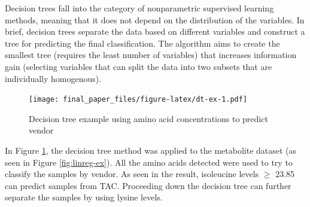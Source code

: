 \documentclass[12pt,openany]{book}
\newenvironment{Shaded}{\begin{snugshade}}{\end{snugshade}}
\newcommand{\KeywordTok}[1]{\textcolor[rgb]{0.13,0.29,0.53}{\textbf{#1}}}
\newcommand{\DataTypeTok}[1]{\textcolor[rgb]{0.13,0.29,0.53}{#1}}
\newcommand{\DecValTok}[1]{\textcolor[rgb]{0.00,0.00,0.81}{#1}}
\newcommand{\StringTok}[1]{\textcolor[rgb]{0.31,0.60,0.02}{#1}}
\newcommand{\OperatorTok}[1]{\textcolor[rgb]{0.81,0.36,0.00}{\textbf{#1}}}
\newcommand{\NormalTok}[1]{#1}
\begin{document}
Decision trees fall into the category of nonparametric supervised
learning methods, meaning that it does not depend on the distribution of
the variables. In brief, decision trees separate the data based on
different variables and construct a tree for predicting the final
classification. The algorithm aims to create the smallest tree (requires
the least number of variables) that increases information gain
(selecting variables that can split the data into two subsets that are
individually homogenous).

\begin{Shaded}
\end{Shaded}

\begin{figure}
\centering
\texttt{[image: final\_paper\_files/figure-latex/dt-ex-1.pdf]}
\caption{\label{fig:dt-ex}Decision tree example using amino acid
concentrations to predict vendor}
\end{figure}

In Figure \ref{fig:dt-ex}, the decision tree method was applied to the
metabolite dataset (as seen in Figure \ref{fig:linreg-ex}). All the
amino acids detected were used to try to classify the samples by vendor.
As seen in the result, isoleucine levels \(\geq\) 23.85 can predict
samples from TAC. Proceeding down the decision tree can further separate
the samples by using lysine levels.
\end{document}
